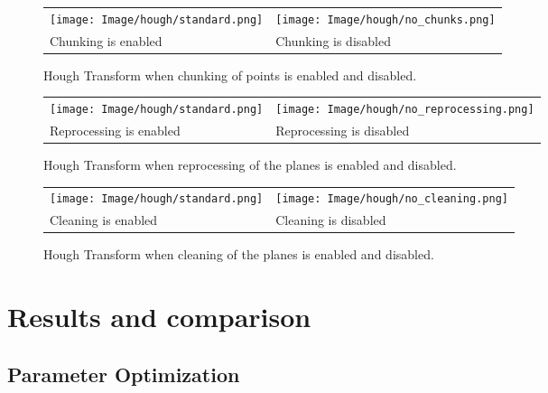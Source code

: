 \documentclass[a4paper,9pt]{article}
\begin{document}
\begin{figure}[H]
    \begin{tabularx}{\textwidth}{XX}
        \texttt{[image: Image/hough/standard.png]} & 
        \texttt{[image: Image/hough/no\_chunks.png]} \\
        Chunking is enabled & Chunking is disabled
    \end{tabularx}
    \caption{Hough Transform when chunking of points is enabled and disabled.}
    \label{fig:hough_chunking_yn}
\end{figure}

\begin{figure}[H]
    \begin{tabularx}{\textwidth}{XX}
        \texttt{[image: Image/hough/standard.png]} & 
        \texttt{[image: Image/hough/no\_reprocessing.png]} \\
        Reprocessing is enabled & Reprocessing is disabled
    \end{tabularx}
    \caption{Hough Transform when reprocessing of the planes is enabled and disabled.}
    \label{fig:hough_reprocessing_yn}
\end{figure}

\begin{figure}[H]
    \begin{tabularx}{\textwidth}{XX}
        \texttt{[image: Image/hough/standard.png]} & 
        \texttt{[image: Image/hough/no\_cleaning.png]} \\
        Cleaning is enabled & Cleaning is disabled
    \end{tabularx}
    \caption{Hough Transform when cleaning of the planes is enabled and disabled.}
    \label{fig:hough_cleaning_yn}
\end{figure}

\newpage

\section{Results and comparison}

\subsection{Parameter Optimization}
\end{document}
